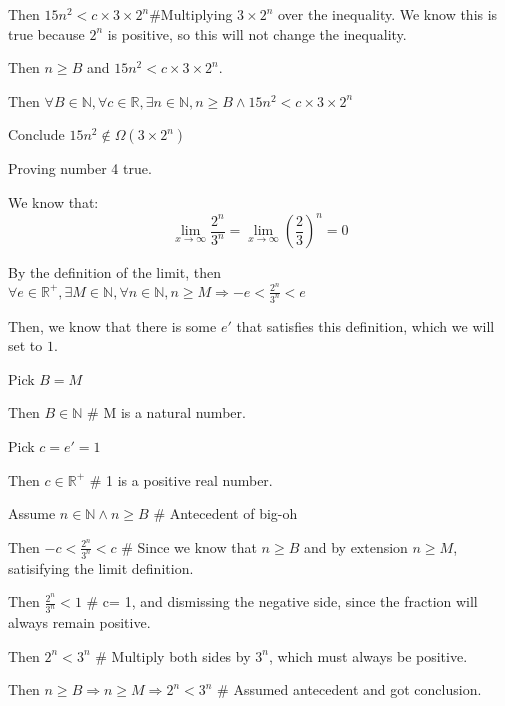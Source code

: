 \documentclass{article}
\begin{document}
\begin{enumerate}
\begin{description}
\begin{description}
			\item Then $15n^2 < c \times 3 \times 2^n$\#Multiplying $3\times 2^n$ over the inequality. We know this is true because $2^n$ is positive, so this will not change the inequality.
			\item Then $n \geq B$ and $15n^2 < c\times 3\times 2^n$.
		\end{description}
		\item Then $\forall B \in \mathbb{N}, \forall c \in \mathbb{R}, \exists n \in \mathbb{N}, n\geq B \wedge 15n^2 < c\times 3 \times 2^n$
		\item Conclude $15n^2 \not \in \Omega(3 \times 2^n)$
	\end{description}
	
\item Proving number 4 true.
\begin{description}
	\item We know that:
	\begin{equation*}
		\lim_{x\to\infty}\frac{2^n}{3^n}=\lim_{x\to\infty} \left(\frac{2}{3}\right)^n = 0
	\end{equation*}
	\item By the definition of the limit, then $\forall e \in \mathbb{R}^+, \exists M \in \mathbb{N}, \forall n \in \mathbb{N}, n \geq M \Rightarrow -e< \frac{2^{n}}{3^{n}} < e$
	\item Then, we know that there is some $e'$ that satisfies this definition, which we will set to $1$.
	\item Pick $B = M$
	\item Then $B \in \mathbb{N}$ \# M is a natural number.
	\item Pick $c = e' = 1$
	\item Then $c \in \mathbb{R}^+$ \# 1 is a positive real number.
	\item Assume $n \in \mathbb{N} \land n \geq B$ \# Antecedent of big-oh
	\begin{description}
		\item Then $-c<\frac{2^n}{3^n}<c$ \# Since we know that $n\geq B$ and by extension $n\geq M$, satisifying the limit definition.
		\item Then $\frac{2^n}{3^n} < 1$ \# c= 1, and dismissing the negative side, since the fraction will always remain positive.
		\item Then $2^n < 3^n$ \# Multiply both sides by $3^n$, which must always be positive.
		\item Then $n \geq B \Rightarrow n\geq M \Rightarrow 2^n < 3^n$ \# Assumed antecedent and got conclusion.

\end{description}
\end{description}
\end{enumerate}
\end{document}
